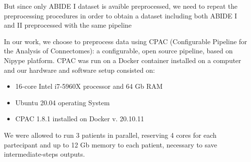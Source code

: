 \documentclass[a4paper,11pt]{article}
\begin{document}
But since only ABIDE I dataset is avaible preprocessed, we need to repeat the preprocessing procedures in order to obtain a dataset including both ABIDE I and II preprocessed with the same pipeline

In our work, we choose to preprocess data using CPAC (Configurable Pipeline for the Analysis of Connectomes): a configurable, open source pipeline, based on Nipype platform.
CPAC was run on a Docker container installed on a computer and our hardware and software setup consisted on:
\begin{itemize}
\item 16-core Intel i7-5960X processor and 64 Gb RAM
\item Ubuntu 20.04 operating System
\item CPAC 1.8.1 installed on Docker v. 20.10.11
\end{itemize}

We were allowed to run 3 patients in parallel, reserving 4 cores for each partecipant and up to 12 Gb memory to each patient, necessary to save intermediate-steps outputs.
\end{document}
